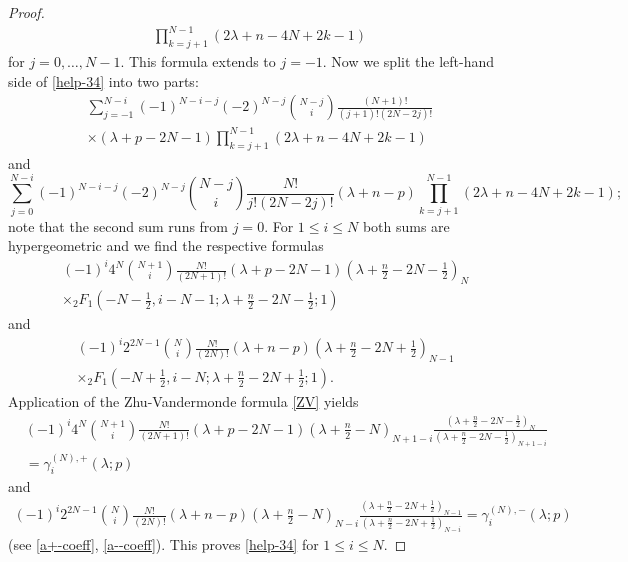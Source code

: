 \documentclass[a4paper,12pt,reqno]{amsart}
\numberwithin{theorem}{subsection}
\numberwithin{equation}{section}
\begin{document}
\begin{proof}
\begin{align}
   \prod_{k=j+1}^{N-1} (2\lambda\!+\!n\!-\!4N\!+\!2k\!-\!1)
\end{align}
for $j=0,\dots,N-1$. This formula extends to $j=-1$. Now we split the left-hand
side of \eqref{help-34} into two parts:
\begin{multline*}
   \sum_{j=-1}^{N-i} (-1)^{N-i-j} (-2)^{N-j} \binom{N-j}{i}
   \frac{(N\!+\!1)!}{(j\!+\!1)! (2N\!-\!2j)!} \\
   \times (\lambda\!+\!p\!-\!2N\!-\!1) \prod_{k=j+1}^{N-1} (2\lambda\!+\!n\!-\!4N\!+\!2k\!-\!1)
\end{multline*}
and
\begin{equation*}
   \sum_{j=0}^{N-i} (-1)^{N-i-j} (-2)^{N-j} \binom{N-j}{i} \frac{N!}{j!(2N\!-\!2j)!}
   (\lambda\!+\!n\!-\!p) \prod_{k=j+1}^{N-1} (2\lambda\!+\!n\!-\!4N\!+\!2k\!-\!1);
\end{equation*}
note that the second sum runs from $j=0$. For $1 \le i \le N$ both sums are
hypergeometric and we find the respective formulas
\begin{align*}
   & (-1)^{i} 4^{N} \binom{N+1}{i} \frac{N!}{(2N\!+\!1)!}
   (\lambda\!+\!p\!-\!2N\!-\!1) \left(\lambda\!+\!\tfrac{n}{2}\!-\!2N-\!\tfrac{1}{2}\right)_N \\
   & \times
   {}_2F_1(-N\!-\!\tfrac{1}{2},i\!-\!N\!-\!1;\lambda\!+\!\tfrac{n}{2}\!-\!2N-\!\tfrac{1}{2};1)
\end{align*}
and
\begin{align*}
   & (-1)^{i} 2^{2N-1} \binom{N}{i} \frac{N!}{(2N)!} (\lambda\!+\!n\!-\!p)
   \left(\lambda\!+\!\tfrac{n}{2}\!-\!2N\!+\!\tfrac{1}{2}\right)_{N-1} \\
   & \times {}_2F_1(-N\!+\!\tfrac{1}{2},i\!-\!N;\lambda\!+\!\tfrac{n}{2}\!-\!2N+\!\tfrac{1}{2};1).
\end{align*}
Application of the Zhu-Vandermonde formula \eqref{ZV} yields
\begin{align*}
   & (-1)^{i} 4^{N} \binom{N+1}{i} \frac{N!}{(2N\!+\!1)!}
   (\lambda\!+\!p\!-\!2N\!-\!1)  \left(\lambda\!+\tfrac{n}{2}\!-\!N \right)_{N+1-i}
   \frac{\left(\lambda\!+\tfrac{n}{2}\!-\!2N\!-\!\tfrac{1}{2}\right)_N}
   {\left(\lambda\!+\tfrac{n}{2}\!-\!2N\!-\!\tfrac{1}{2}\right)_{N+1-i}} \\
   & = \gamma_i^{(N),+}(\lambda;p)
\end{align*}
and
\begin{align*}
   (-1)^{i} 2^{2N-1} \binom{N}{i} \frac{N!}{(2N)!} (\lambda\!+\!n\!-\!p)
   \left(\lambda\!+\!\tfrac{n}{2}\!-\!N\right)_{N-i}
   \frac{\left(\lambda\!+\tfrac{n}{2}\!-\!2N\!+\!\tfrac{1}{2}\right)_{N-1}}
   {\left(\lambda\!+\tfrac{n}{2}\!-\!2N\!+\!\tfrac{1}{2}\right)_{N-i}} = \gamma_i^{(N),-}(\lambda;p)
\end{align*}
(see \eqref{a+-coeff}, \eqref{a--coeff}). This proves \eqref{help-34} for $1
\le i \le N$.
\end{proof}
\end{document}
